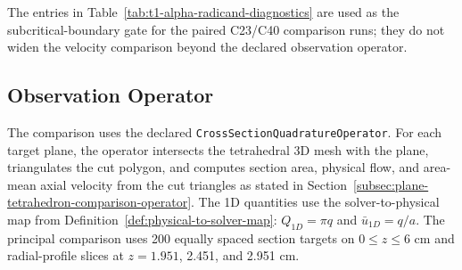 \begin{table}[!htb]
    \centering
    \scriptsize
    \caption{Recorded subcritical-boundary diagnostics for the same C23/C40
    1D runs used in the resolved-velocity comparison. The positive
    characteristic-radicand values are in solver units of cm$^2$/s$^2$; the
    persisted $\lambda_-$, $\lambda_+$, and subcriticality margin support the
    boundary-regime gate in Assumption~\ref{ass:1d-subcritical-boundary-regime}.}
    \label{tab:t1-alpha-radicand-diagnostics}
\end{table}

The entries in Table~\ref{tab:t1-alpha-radicand-diagnostics} are used as the
subcritical-boundary gate for the paired C23/C40 comparison runs; they do not
widen the velocity comparison beyond the declared observation operator.

\FloatBarrier

\subsection{Observation Operator}
\label{subsec:cross-sectional-sampling-protocol-results}

The comparison uses the declared
\texttt{CrossSectionQuadratureOperator}. For each target plane, the operator
intersects the tetrahedral 3D mesh with the plane, triangulates the cut polygon,
and computes section area, physical flow, and area-mean axial velocity from the
cut triangles as stated in Section~\ref{subsec:plane-tetrahedron-comparison-operator}.
The 1D quantities use the solver-to-physical map from
Definition~\ref{def:physical-to-solver-map}: $Q_{1D}=\pi q$ and
$\bar u_{1D}=q/a$. The principal comparison uses 200 equally spaced section
targets on $0\le z\le6$ cm and radial-profile slices at $z=1.951$, 2.451, and
2.951 cm.

